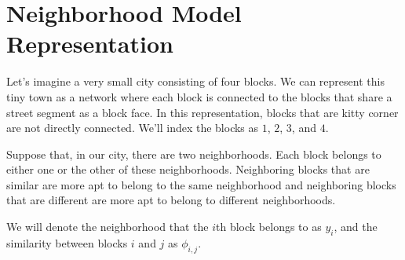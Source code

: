 \section*{Neighborhood Model Representation}
Let's imagine a very small city consisting of four blocks. We can
represent this tiny town as a network where each block is connected
to the blocks that share a street segment as a block face. In this
representation, blocks that are kitty corner are not directly
connected. We'll index the blocks as $1$, $2$, $3$, and $4$.

\begin{figure}[h]
\centering
{}
\end{figure}

\begin{figure}[h]
\centering


\end{figure}

Suppose that, in our city, there are two neighborhoods. Each block
belongs to either one or the other of these neighborhoods. Neighboring
blocks that are similar are more apt to belong to the same
neighborhood and neighboring blocks that are different are more apt to
belong to different neighborhoods.

We will denote the neighborhood that the $i$th block belongs to as
$y_i$, and the similarity between blocks $i$ and $j$ as $\phi_{i,j}$.

\begin{figure}[!h]
\centering


\end{figure}

